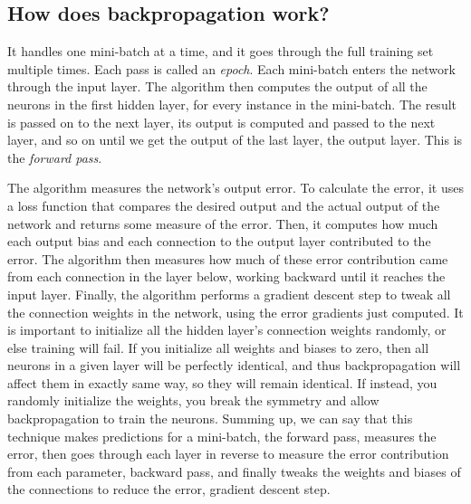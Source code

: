 \subsection{How does backpropagation work?}
It handles one mini-batch at a time, and it goes through the full training set multiple times. Each pass is called an \textit{epoch}. Each mini-batch enters the network through the input layer. The algorithm then computes the output of all the neurons in the first hidden layer, for every instance in the mini-batch. The result is passed on to the next layer, its output is computed and passed to the next layer, and so on until we get the output of the last layer, the output layer. 
This is the \textit{forward pass}.

The algorithm measures the network's output error. To calculate the error, it uses a loss function that compares the desired output and the actual output of the network and returns some measure of the error. 
Then, it computes how much each output bias and each connection to the output layer contributed to the error. The algorithm then measures how much of these error contribution came from each connection in the layer below, working backward until it reaches the input layer. 
Finally, the algorithm performs a gradient descent step to tweak all the connection weights in the network, using the error gradients just computed. 
It is important to initialize all the hidden layer's connection weights randomly, or else training will fail. If you initialize all weights and biases to zero, then all neurons in a given layer will be perfectly identical, and thus backpropagation will affect them in exactly same way, so they will remain identical. If instead, you randomly initialize the weights, you break the symmetry and allow backpropagation to train the neurons. 
Summing up, we can say that this technique makes predictions for a mini-batch, the forward pass, measures the error, then goes through each layer in reverse to measure the error contribution from each parameter, backward pass, and finally tweaks the weights and biases of the connections to reduce the error, gradient descent step. 

